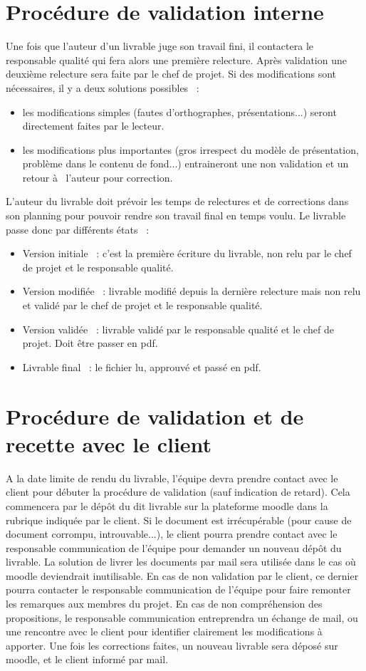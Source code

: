 \section{Procédure de validation interne}
  Une fois que l'auteur d'un livrable juge son travail fini, il contactera le responsable qualité qui fera alors une première relecture. Après validation une deuxième relecture sera faite par le chef de projet.
Si des modifications sont nécessaires, il y a deux solutions possibles  :
\begin{itemize}
    \item les modifications simples (fautes d'orthographes, présentations...) seront directement faites par le lecteur.
    \item les modifications plus importantes (gros irrespect du modèle de présentation, problème dans le contenu de fond...) entraineront une non validation et un retour à  l'auteur pour correction.
\end{itemize}
    L'auteur du livrable doit prévoir les temps de relectures et de corrections dans son planning pour pouvoir rendre son travail final en temps voulu.
    Le livrable passe donc par différents états  :
\begin{itemize}
    \item Version initiale  : c'est la première écriture du livrable, non relu par le chef de projet et le responsable qualité.
    \item Version modifiée  : livrable modifié depuis la dernière relecture mais non relu et validé par le chef de projet et le responsable qualité.
    \item Version validée  : livrable validé par le responsable qualité et le chef de projet. Doit être passer en pdf.
    \item Livrable final  : le fichier lu, approuvé et passé en pdf.
\end{itemize}

\section{Procédure de validation et de recette avec le client}
    A la date limite de rendu du livrable, l'équipe devra prendre contact avec le client pour débuter la procédure de validation (sauf indication de retard). Cela commencera par le dépôt du dit livrable sur la plateforme moodle dans la rubrique indiquée par le client.
    Si le document est irrécupérable (pour cause de document corrompu, introuvable...), le client pourra prendre contact avec le responsable communication de l'équipe pour demander un nouveau dépôt du livrable. La solution de livrer les documents par mail sera utilisée dans le cas où moodle deviendrait inutilisable.
    En cas de non validation par le client, ce dernier pourra contacter le responsable communication de l'équipe pour faire remonter les remarques aux membres du projet. En cas de non compréhension des propositions, le responsable communication entreprendra un échange de mail, ou une rencontre avec le client pour identifier clairement les modifications à  apporter.
    Une fois les corrections faites, un nouveau livrable sera déposé sur moodle, et le client informé par mail.

